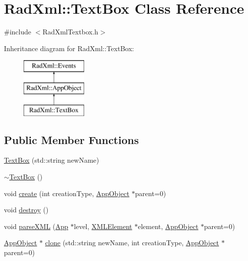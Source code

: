 \hypertarget{class_rad_xml_1_1_text_box}{\section{Rad\-Xml\-:\-:Text\-Box Class Reference}
\label{class_rad_xml_1_1_text_box}
}


{\ttfamily \#include $<$Rad\-Xml\-Textbox.\-h$>$}

Inheritance diagram for Rad\-Xml\-:\-:Text\-Box\-:\begin{figure}[H]
\begin{center}
\leavevmode
\includegraphics[height=3.000000cm]{class_rad_xml_1_1_text_box}
\end{center}
\end{figure}
\subsection*{Public Member Functions}
\begin{DoxyCompactItemize}
\item 
\hyperlink{class_rad_xml_1_1_text_box_a1191f17ce0c48a748ac69068ce886183}{Text\-Box} (std\-::string new\-Name)
\item 
\hyperlink{class_rad_xml_1_1_text_box_a0e824483def7098ec9f1b2274a679e63}{$\sim$\-Text\-Box} ()
\item 
void \hyperlink{class_rad_xml_1_1_text_box_a550da38363679bbdc3d0298ff9b53a11}{create} (int creation\-Type, \hyperlink{class_rad_xml_1_1_app_object}{App\-Object} $\ast$parent=0)
\item 
void \hyperlink{class_rad_xml_1_1_text_box_ae5e9de78c036c4ce39255c1f4beddd9e}{destroy} ()
\item 
void \hyperlink{class_rad_xml_1_1_text_box_ae844b8e9ba97a2f8aafe4ebab285bb88}{parse\-X\-M\-L} (\hyperlink{class_rad_xml_1_1_app}{App} $\ast$level, \hyperlink{class_x_m_l_element}{X\-M\-L\-Element} $\ast$element, \hyperlink{class_rad_xml_1_1_app_object}{App\-Object} $\ast$parent=0)
\item 
\hyperlink{class_rad_xml_1_1_app_object}{App\-Object} $\ast$ \hyperlink{class_rad_xml_1_1_text_box_a9c4013746c5fe5e260bc0a4e3fac577a}{clone} (std\-::string new\-Name, int creation\-Type, \hyperlink{class_rad_xml_1_1_app_object}{App\-Object} $\ast$parent=0)
\end{DoxyCompactItemize}

